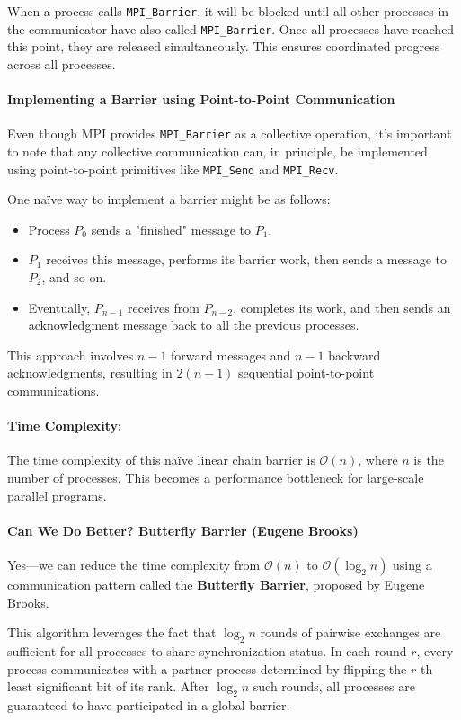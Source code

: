 \documentclass[12pt]{book}
\begin{document}
When a process calls \texttt{MPI\_Barrier}, it will be blocked until all other processes in the communicator have also called \texttt{MPI\_Barrier}. Once all processes have reached this point, they are released simultaneously. This ensures coordinated progress across all processes.

\paragraph{Implementing a Barrier using Point-to-Point Communication}  
Even though MPI provides \texttt{MPI\_Barrier} as a collective operation, it's important to note that any collective communication can, in principle, be implemented using point-to-point primitives like \texttt{MPI\_Send} and \texttt{MPI\_Recv}.

One naïve way to implement a barrier might be as follows:
\begin{itemize}
    \item Process $P_0$ sends a "finished" message to $P_1$.
    \item $P_1$ receives this message, performs its barrier work, then sends a message to $P_2$, and so on.
    \item Eventually, $P_{n-1}$ receives from $P_{n-2}$, completes its work, and then sends an acknowledgment message back to all the previous processes.
\end{itemize}
This approach involves $n - 1$ forward messages and $n - 1$ backward acknowledgments, resulting in $2(n - 1)$ sequential point-to-point communications.

\paragraph{Time Complexity:}  
The time complexity of this naïve linear chain barrier is $\mathcal{O}(n)$, where $n$ is the number of processes. This becomes a performance bottleneck for large-scale parallel programs.

\paragraph{Can We Do Better? Butterfly Barrier (Eugene Brooks)}  
Yes—we can reduce the time complexity from $\mathcal{O}(n)$ to $\mathcal{O}(\log_2 n)$ using a communication pattern called the \textbf{Butterfly Barrier}, proposed by Eugene Brooks.

This algorithm leverages the fact that $\log_2 n$ rounds of pairwise exchanges are sufficient for all processes to share synchronization status. In each round $r$, every process communicates with a partner process determined by flipping the $r$-th least significant bit of its rank. After $\log_2 n$ such rounds, all processes are guaranteed to have participated in a global barrier.
\end{document}
